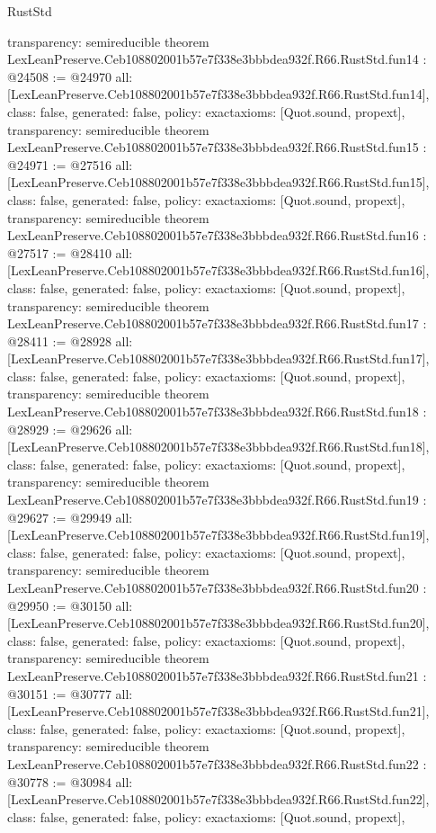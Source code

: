 \begin{lexlean}{RustStd}
\begin{coremodule}
{  transparency: semireducible
}
theorem LexLeanPreserve.Ceb108802001b57e7f338e3bbbdea932f.R66.RustStd.fun14 : @24508 := @24970 {
  all: [LexLeanPreserve.Ceb108802001b57e7f338e3bbbdea932f.R66.RustStd.fun14],
  class: false,
  generated: false,
  policy: exact{axioms: [Quot.sound, propext]},
  transparency: semireducible
}
theorem LexLeanPreserve.Ceb108802001b57e7f338e3bbbdea932f.R66.RustStd.fun15 : @24971 := @27516 {
  all: [LexLeanPreserve.Ceb108802001b57e7f338e3bbbdea932f.R66.RustStd.fun15],
  class: false,
  generated: false,
  policy: exact{axioms: [Quot.sound, propext]},
  transparency: semireducible
}
theorem LexLeanPreserve.Ceb108802001b57e7f338e3bbbdea932f.R66.RustStd.fun16 : @27517 := @28410 {
  all: [LexLeanPreserve.Ceb108802001b57e7f338e3bbbdea932f.R66.RustStd.fun16],
  class: false,
  generated: false,
  policy: exact{axioms: [Quot.sound, propext]},
  transparency: semireducible
}
theorem LexLeanPreserve.Ceb108802001b57e7f338e3bbbdea932f.R66.RustStd.fun17 : @28411 := @28928 {
  all: [LexLeanPreserve.Ceb108802001b57e7f338e3bbbdea932f.R66.RustStd.fun17],
  class: false,
  generated: false,
  policy: exact{axioms: [Quot.sound, propext]},
  transparency: semireducible
}
theorem LexLeanPreserve.Ceb108802001b57e7f338e3bbbdea932f.R66.RustStd.fun18 : @28929 := @29626 {
  all: [LexLeanPreserve.Ceb108802001b57e7f338e3bbbdea932f.R66.RustStd.fun18],
  class: false,
  generated: false,
  policy: exact{axioms: [Quot.sound, propext]},
  transparency: semireducible
}
theorem LexLeanPreserve.Ceb108802001b57e7f338e3bbbdea932f.R66.RustStd.fun19 : @29627 := @29949 {
  all: [LexLeanPreserve.Ceb108802001b57e7f338e3bbbdea932f.R66.RustStd.fun19],
  class: false,
  generated: false,
  policy: exact{axioms: [Quot.sound, propext]},
  transparency: semireducible
}
theorem LexLeanPreserve.Ceb108802001b57e7f338e3bbbdea932f.R66.RustStd.fun20 : @29950 := @30150 {
  all: [LexLeanPreserve.Ceb108802001b57e7f338e3bbbdea932f.R66.RustStd.fun20],
  class: false,
  generated: false,
  policy: exact{axioms: [Quot.sound, propext]},
  transparency: semireducible
}
theorem LexLeanPreserve.Ceb108802001b57e7f338e3bbbdea932f.R66.RustStd.fun21 : @30151 := @30777 {
  all: [LexLeanPreserve.Ceb108802001b57e7f338e3bbbdea932f.R66.RustStd.fun21],
  class: false,
  generated: false,
  policy: exact{axioms: [Quot.sound, propext]},
  transparency: semireducible
}
theorem LexLeanPreserve.Ceb108802001b57e7f338e3bbbdea932f.R66.RustStd.fun22 : @30778 := @30984 {
  all: [LexLeanPreserve.Ceb108802001b57e7f338e3bbbdea932f.R66.RustStd.fun22],
  class: false,
  generated: false,
  policy: exact{axioms: [Quot.sound, propext]},
}
\end{coremodule}
\end{lexlean}
